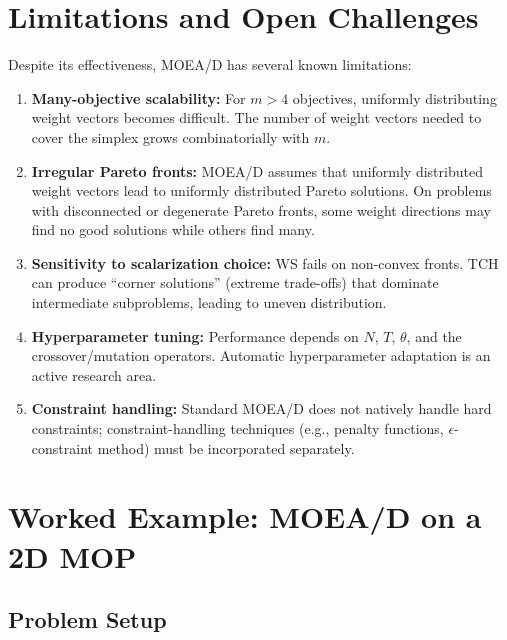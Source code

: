 \documentclass[12pt,a4paper]{article}
\begin{document}
\section{Limitations and Open Challenges}
\label{sec:limitations}

Despite its effectiveness, MOEA/D has several known limitations:

\begin{enumerate}[leftmargin=1.5cm]
    \item \textbf{Many-objective scalability:} For $m > 4$ objectives, uniformly distributing weight vectors becomes difficult. The number of weight vectors needed to cover the simplex grows combinatorially with $m$.

    \item \textbf{Irregular Pareto fronts:} MOEA/D assumes that uniformly distributed weight vectors lead to uniformly distributed Pareto solutions. On problems with disconnected or degenerate Pareto fronts, some weight directions may find no good solutions while others find many.

    \item \textbf{Sensitivity to scalarization choice:} WS fails on non-convex fronts. TCH can produce ``corner solutions'' (extreme trade-offs) that dominate intermediate subproblems, leading to uneven distribution.

    \item \textbf{Hyperparameter tuning:} Performance depends on $N$, $T$, $\theta$, and the crossover/mutation operators. Automatic hyperparameter adaptation is an active research area.

    \item \textbf{Constraint handling:} Standard MOEA/D does not natively handle hard constraints; constraint-handling techniques (e.g., penalty functions, $\epsilon$-constraint method) must be incorporated separately.
\end{enumerate}

\section{Worked Example: MOEA/D on a 2D MOP}
\label{sec:example}

\subsection{Problem Setup}
\end{document}
